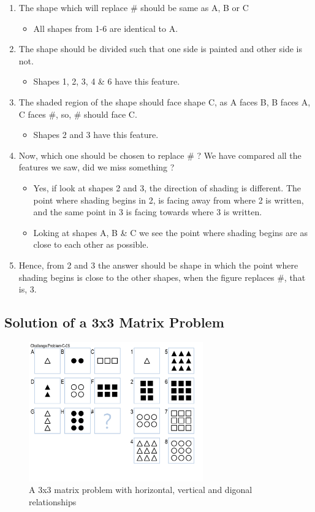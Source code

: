 \documentclass[
	letterpaper, %
]{jdf}
\begin{document}
\begin{enumerate}
	\item The shape which will replace \# should be same as A, B or C
		\begin{itemize}
			\item All shapes from 1-6 are identical to A.
		\end{itemize}
	\item The shape should be divided such that one side is painted and other side is not.
     	\begin{itemize}
     		\item Shapes 1, 2, 3, 4 \& 6 have this feature.
 		\end{itemize}
	\item The shaded region of the shape should face shape C, as A faces B, B faces A, C faces \#, so, \# should face C.
		\begin{itemize}
			\item Shapes 2 and 3 have this feature.
		\end{itemize}
	\item Now, which one should be chosen to replace \# ? We have compared all the features we saw, did we miss something ?
		\begin{itemize}
			\item Yes, if look at shapes 2 and 3, the direction of shading is different. The point where shading begins in 2, is facing away from where 2 is written, and the same point in 3 is facing towards where 3 is written.
			\item Loking at shapes A, B \& C we see the point where shading begins are as close to each other as possible.
		\end{itemize}
	\item Hence, from 2 and 3 the answer should be shape in which the point where shading begins is close to the other shapes, when the figure replaces \#, that is, 3.
\end{enumerate}

\subsection{Solution of a 3x3 Matrix Problem} %
\begin{figure}[h]
	\centering
	\includegraphics[height=6cm]{Figures/Challenge_Problem_C-06.PNG}
	\caption{A 3x3 matrix problem with horizontal, vertical and digonal relationships}
	\label{fig:problem_3x3}
\end{figure}
\end{document}
